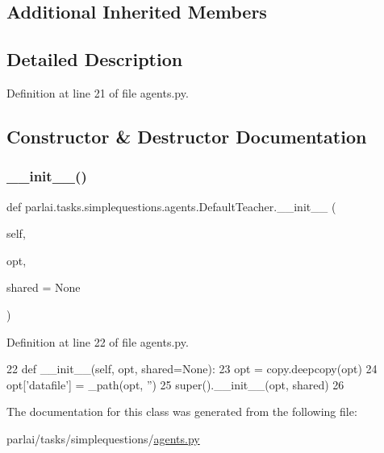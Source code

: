 \subsection*{Additional Inherited Members}


\subsection{Detailed Description}


Definition at line 21 of file agents.\+py.



\subsection{Constructor \& Destructor Documentation}
\mbox{\label{classparlai_1_1tasks_1_1simplequestions_1_1agents_1_1DefaultTeacher_a94f826fb0eec41783ccfdab6ba77c0d1}} 
\subsubsection{\texorpdfstring{\+\_\+\+\_\+init\+\_\+\+\_\+()}{\_\_init\_\_()}}
{\footnotesize\ttfamily def parlai.\+tasks.\+simplequestions.\+agents.\+Default\+Teacher.\+\_\+\+\_\+init\+\_\+\+\_\+ (\begin{DoxyParamCaption}\item[{}]{self,  }\item[{}]{opt,  }\item[{}]{shared = {\ttfamily None} }\end{DoxyParamCaption})}



Definition at line 22 of file agents.\+py.


\begin{DoxyCode}
22     \textcolor{keyword}{def }\_\_init\_\_(self, opt, shared=None):
23         opt = copy.deepcopy(opt)
24         opt[\textcolor{stringliteral}{'datafile'}] = \_path(opt, \textcolor{stringliteral}{''})
25         super().\_\_init\_\_(opt, shared)
26 \end{DoxyCode}


The documentation for this class was generated from the following file\+:\begin{DoxyCompactItemize}
\item 
parlai/tasks/simplequestions/\hyperlink{parlai_2tasks_2simplequestions_2agents_8py}{agents.\+py}\end{DoxyCompactItemize}
